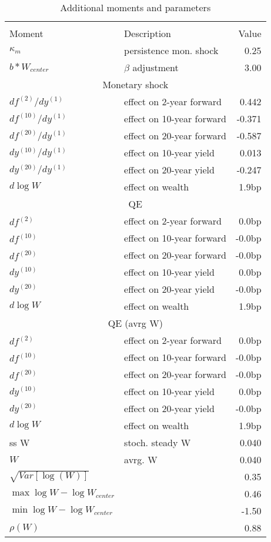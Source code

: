 \begin{table}[htbp]\centering  
 \bgroup  
 \def\arraystretch{1.25}\caption{Additional moments and parameters} 
\begin{tabular}{llr} 
\hline\hline 
\multicolumn{3}{c}{} \\ 
Moment & Description & Value  \\ 
$\kappa_m$ & persistence mon. shock  & 0.25   \\ 
$b*W_{center}$ & $\beta$ adjustment  & 3.00   \\ 
\hline 
\multicolumn{3}{c}{Monetary shock} \\ 
$df^{(2)}/dy^{(1)} $ & effect on 2-year forward  & 0.442 \\ 
$df^{(10)}/dy^{(1)} $ & effect on 10-year forward  & -0.371 \\ 
$df^{(20)}/dy^{(1)} $ & effect on 20-year forward  & -0.587 \\ 
$dy^{(10)}/dy^{(1)} $ & effect on 10-year yield  & 0.013 \\ 
$dy^{(20)}/dy^{(1)} $ & effect on 20-year yield  & -0.247 \\ 
$d\log W$ & effect on wealth  & 1.9bp \\ 
\hline 
\multicolumn{3}{c}{QE} \\ 
$df^{(2)}$ & effect on 2-year forward  & 0.0bp \\ 
$df^{(10)}$ & effect on 10-year forward  & -0.0bp \\ 
$df^{(20)}$ & effect on 20-year forward  & -0.0bp \\ 
$dy^{(10)}$ & effect on 10-year yield  & 0.0bp \\ 
$dy^{(20)}$ & effect on 20-year yield  & -0.0bp \\ 
$d\log W$ & effect on wealth  & 1.9bp \\ 
\hline 
\multicolumn{3}{c}{QE (avrg W)} \\ 
$df^{(2)} $ & effect on 2-year forward  & 0.0bp \\ 
$df^{(10)} $ & effect on 10-year forward  & -0.0bp \\ 
$df^{(20)} $ & effect on 20-year forward  & -0.0bp \\ 
$dy^{(10)} $ & effect on 10-year yield  & 0.0bp \\ 
$dy^{(20)} $ & effect on 20-year yield  & -0.0bp \\ 
$d\log W$ & effect on wealth  & 1.9bp \\ 
\hline 
ss W & stoch. steady W & 0.040   \\ 
$W$ & avrg. W & 0.040   \\ 
$\sqrt{Var[\log(W)]}$ &  & 0.35   \\ 
$\max \log W - \log W_{center} $ &  & 0.46   \\ 
$\min \log W - \log W_{center} $ &  & -1.50   \\ 
$\rho(W)$ &  & 0.88   \\ 
\hline 
\hline\hline 
\end{tabular} 
 \egroup 
\end{table} 

